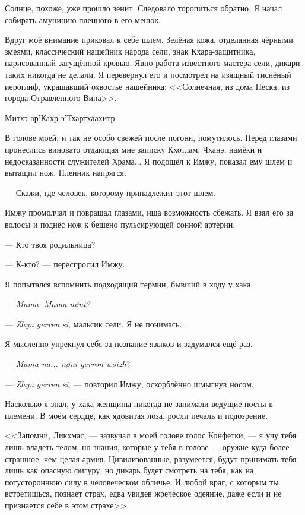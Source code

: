 Солнце, похоже, уже прошло зенит.
Следовало торопиться обратно.
Я начал собирать амуницию пленного в его мешок.

Вдруг моё внимание приковал к себе шлем.
Зелёная кожа, отделанная чёрными змеями, классический нашейник народа сели, знак Кхара-защитника, нарисованный загущённой кровью.
Явно работа известного мастера-сели, дикари таких никогда не делали.
Я перевернул его и посмотрел на изящный тиснёный иероглиф, украшавший охвостье нашейника: <<Солнечная, из дома Песка, из города Отравленного Вина>>.

Митхэ ар’Кахр э’Тхартхаахитр.

В голове моей, и так не особо свежей после погони, помутилось.
Перед глазами пронеслись виновато отдающая мне записку Кхотлам, Чханэ, намёки и недосказанности служителей Храма...
Я подошёл к Имжу, показал ему шлем и вытащил нож.
Пленник напрягся.

--- Скажи, где человек, которому принадлежит этот шлем.

Имжу промолчал и повращал глазами, ища возможность сбежать.
Я взял его за волосы и поднёс нож к бешено пульсирующей сонной артерии.

--- Кто твоя родильница?

--- К-кто? --- переспросил Имжу.

Я попытался вспомнить подходящий термин, бывший в ходу у хака.

--- \textit{Mama.}
\textit{Mama n\o{}nt?}

--- \textit{Zhyu gerren si}\FM, мальсик сели.
Я не понимась...

Я мысленно упрекнул себя за незнание языков и задумался ещё раз.

--- \textit{Mama na... n\o{}ni gerron w\o{}izh}\FM?

--- \textit{Zhyu gerren si}, --- повторил Имжу, оскорблённо шмыгнув носом.

Насколько я знал, у хака женщины никогда не занимали ведущие посты в племени.
В моём сердце, как ядовитая лоза, росли печаль и подозрение.

<<Запомни, Ликхмас, --- зазвучал в моей голове голос Конфетки, --- я учу тебя лишь владеть телом, но знания, которые у тебя в голове --- оружие куда более страшное, чем целая армия.
Цивилизованные, разумеется, будут принимать тебя лишь как опасную фигуру, но дикарь будет смотреть на тебя, как на потустороннюю силу в человеческом обличье.
И любой враг, с которым ты встретишься, познает страх, едва увидев жреческое одеяние, даже если и не признается себе в этом страхе>>.

